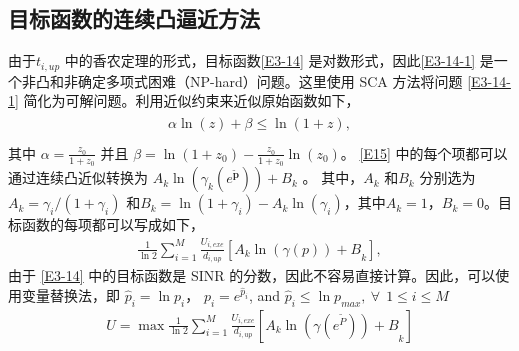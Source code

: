 \subsection{ 目标函数的连续凸逼近方法}\label{section3-3-1}
由于$t_{i,up}$ 中的香农定理的形式，目标函数\eqref{E3-14} 是对数形式，因此\eqref{E3-14-1} 是一个非凸和非确定多项式困难（NP-hard）问题。这里使用 SCA 方法将问题 \eqref{E3-14-1} 简化为可解问题。利用近似约束来近似原始函数如下，
\begin{eqnarray}\label{E15}
\begin{array}{ll}
\alpha \ln{\left(z\right)}+\beta\le \ln{\left(1+z\right)},\\
\end{array}
\end{eqnarray}
其中 $\alpha=\frac{z_0}{1+z_0}$ 并且 $\beta=\ln{\left(1+z_0\right)}-\frac{z_0}{1+z_0}\ln{\left(z_0\right)}$。 \eqref{E15} 中的每个项都可以通过连续凸近似转换为 $A_k\ln\left(\gamma_k\left(e^{\widetilde{\mathbf{p}}}\right)\right)+B_k$ 。 其中，$A_k$ 和$B_k$ 分别选为$A_k=\gamma_i/\left(1+\gamma_i\right)$ 和$B_k=\ln{\left(1+\gamma_i\right)}-A_k\ln{\left(\gamma_i\right)}$，其中$A_k=1$，$B_k=0$。目标函数的每项都可以写成如下，
\begin{eqnarray}\label{E16}
\frac{1}{\ln{2}}\sum_{i=1}^{M}{\frac{U_{i,exe}}{d_{i,up}}\left.\left[{A_k\ln{\left(\gamma\left(p\right)\right)}+B}_k\right.\right]},
\end{eqnarray}
由于 \eqref{E3-14} 中的目标函数是 SINR 的分数，因此不容易直接计算。因此，可以使用变量替换法，即 ${\hat{p}}_i=\ln{p_i}$，
$p_i=e^{{\hat{p}}_i}$, and ${\hat{p}}_i\le \ln{p_{max}},\ \forall\ \ 1\le i\le M$
\begin{eqnarray}\label{E17}
U=\max\frac{1}{\ln{2}}\sum_{i=1}^{M}\left.\frac{U_{i,exe}}{d_{i,up}}\left[{A_k\ln{\left(\gamma\left(e^{\widetilde{P}}\right)\right)}+B}_k\right.\right]
\end{eqnarray}

